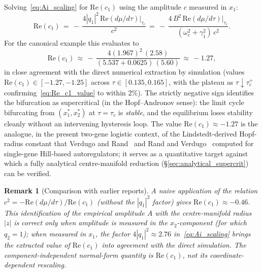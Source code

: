 \documentclass[sn-mathphys,Numbered]{sn-jnl}
\theoremstyle{thmstyleone}
\theoremstyle{thmstyletwo}
\theoremstyle{thmstylethree}
\newtheorem{remark}{Remark}
\begin{document}
Solving~\eqref{eq:Ai_scaling} for $\mathrm{Re}(c_1)$ using the
amplitude $c$ measured in $x_1$:
\begin{equation}
\mathrm{Re}(c_1)
\,=\, -\,\frac{4|q_1|^{2}\,\mathrm{Re}(d\mu/d\tau)|_{\tau_c}}{c^{2}}
\,=\, -\,\frac{4\,B^{2}\,\mathrm{Re}(d\mu/d\tau)|_{\tau_c}}
              {(\omega_c^{2}+\gamma_1^{2})\,c^{2}}.
\label{eq:Re_c1_formula}
\end{equation}
For the canonical example this evaluates to
\begin{equation}
\mathrm{Re}(c_1) \,\approx\, -\,\frac{4(1.967)^{2}\,(2.58)}
                                     {(5.537+0.0625)\,(5.60)}
\,\approx\, -1.27,
\label{eq:Re_c1_value}
\end{equation}
in close agreement with the direct numerical extraction by simulation
(values $\mathrm{Re}(c_1)\in[-1.27,-1.25]$ across
$\tau\in[0.135,0.165]$, with the plateau as $\tau\downarrow\tau_c^{+}$
confirming~\eqref{eq:Re_c1_value} to within $2\%$). The strictly
negative sign identifies the bifurcation as supercritical
(in the Hopf--Andronov sense): the limit cycle bifurcating from
$(x_1^{*},x_2^{*})$ at $\tau=\tau_c$ is \emph{stable}, and the
equilibrium loses stability cleanly without an intervening hysteresis
loop. The value $\mathrm{Re}(c_1)\approx -1.27$ is the analogue, in
the present two-gene logistic context, of the Lindstedt-derived
Hopf-radius constant that Verdugo and Rand~\cite{verdugo2008hopf} and
Rand and Verdugo~\cite{rand2007hopf} computed for single-gene
Hill-based autoregulators; it serves as a quantitative target against
which a fully analytical centre-manifold reduction
(\S\ref{sec:analytical_supercrit}) can be verified.

\begin{remark}[Comparison with earlier reports]
\label{rem:c1_correction}
A naive application of the relation
$c^{2}=-\mathrm{Re}(d\mu/d\tau)/\mathrm{Re}(c_1)$ (without the
$|q_1|^{2}$ factor) gives $\mathrm{Re}(c_1)\approx -0.46$. This
identification of the empirical amplitude $A$ with the centre-manifold
radius $|z|$ is correct only when amplitude is measured in the
$x_2$-component (for which $q_2=1$); when measured in $x_1$, the
factor $4|q_1|^{2}\approx 2.76$ in~\eqref{eq:Ai_scaling} brings the
extracted value of $\mathrm{Re}(c_1)$ into agreement with the direct
simulation. The component-independent normal-form quantity is
$\mathrm{Re}(c_1)$, not its coordinate-dependent rescaling.
\end{remark}

\end{document}
